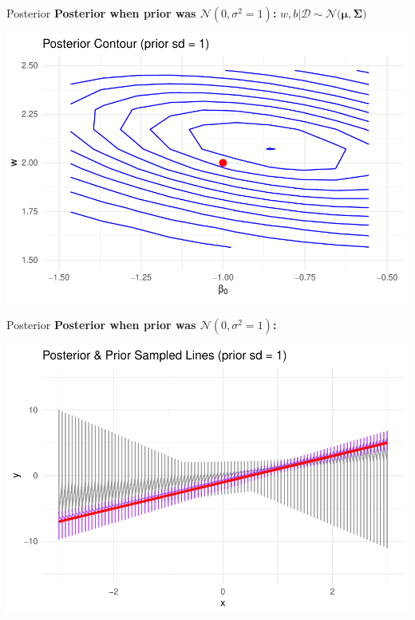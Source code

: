 \documentclass{beamer}
\begin{document}
\begin{frame}{Posterior}
  \textbf{Posterior when prior was \(\mathcal{N}(0, \sigma^2=1)\):}
  \(
    w, b | \mathcal{D} \sim \mathcal{N}\big(\bm{\mu}, \bm{\Sigma}\big)
  \)

  \begin{center}
    \includegraphics[width=0.8\linewidth]{posterior_contour_1.pdf}
  \end{center}
\end{frame}

\begin{frame}{Posterior}
  \textbf{Posterior when prior was \(\mathcal{N}(0, \sigma^2=1)\):}

  \begin{center}
    \includegraphics[width=0.8\linewidth]{posterior_lines_1.pdf}
  \end{center}
\end{frame}
\end{document}
